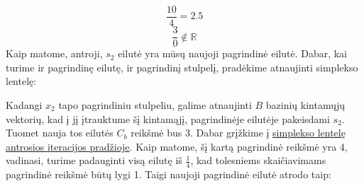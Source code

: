 \documentclass{article}
\begin{document}
\begin{equation*}
    \frac{10}{4} = 2.5
\end{equation*}
\begin{equation*}
    \frac{3}{0}\not\in \mathbb{R}
\end{equation*}
Kaip matome, antroji, $s_2$ eilutė yra mūsų naujoji pagrindinė eilutė. Dabar, kai turime ir pagrindinę eilutę, ir pagrindinį stulpelį, pradėkime atnaujinti simplekso lentelę:
\begin{table}[H]
    \centering
\end{table}
Kadangi $x_2$ tapo pagrindiniu stulpeliu, galime atnaujinti $B$ bazinių kintamųjų vektorių, kad į jį įtrauktume šį kintamąjį, pagrindinėje eilutėje pakeisdami $s_2$. Tuomet nauja tos eilutės  $C_b$ reikšmė bus 3. Dabar grįžkime į \hyperref[table:2]{simplekso lentelę antrosios iteracijos pradžioje}. Kaip matome, šį kartą pagrindinė reikšmė yra 4, vadinasi, turime padauginti visą eilutę iš $\frac{1}{4}$, kad tolesniems skaičiavimams pagrindinė reikšmė būtų lygi 1. Taigi naujoji pagrindinė eilutė atrodo taip:
\end{document}
